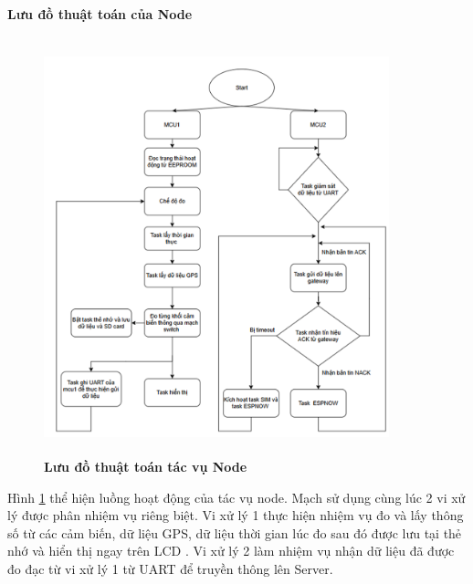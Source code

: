 \documentclass{article} %
\begin{document}
	\paragraph{Lưu đồ thuật toán của Node}\mbox{}
	\begin{figure}[!ht]
		\centering
		\includegraphics[width=10cm,height=12cm]{Images/FirmNode.png}
		\caption[ Lưu đồ thuật toán tác vụ Node ]{\bfseries \fontsize{12pt}{0pt}\selectfont  Lưu đồ thuật toán tác vụ Node}
		\label{FirmNode}
	\end{figure}
	
	Hình \ref{FirmNode} thể hiện luồng hoạt động của tác vụ node. Mạch sử dụng cùng lúc 2 vi xử lý được phân nhiệm vụ riêng biệt. Vi xử lý 1 thực hiện nhiệm vụ đo và lấy thông số từ các cảm biến, dữ liệu GPS, dữ liệu thời gian lúc đo sau đó được lưu tại thẻ nhớ và hiển thị ngay trên LCD . Vi xử lý 2 làm nhiệm vụ nhận dữ liệu đã được đo đạc từ vi xử lý 1 từ UART để truyền thông lên Server.
	
\end{document}
